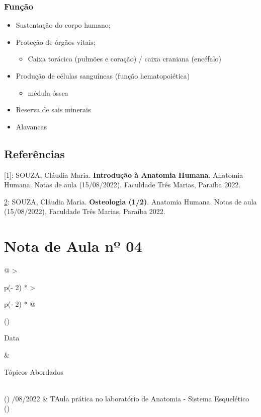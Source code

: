 \documentclass[
]{book}
\providecommand{\tightlist}{%
  \setlength{\itemsep}{0pt}\setlength{\parskip}{0pt}}
\begin{document}
\hypertarget{funuxe7uxe3o}{%
\subsubsection{Função}\label{funuxe7uxe3o}}

\begin{itemize}
\tightlist
\item
  Sustentação do corpo humano;
\item
  Proteção de órgãos vitais;

  \begin{itemize}
  \tightlist
  \item
    Caixa torácica (pulmões e coração) / caixa craniana (encéfalo)
  \end{itemize}
\item
  Produção de células sanguíneas (função hematopoiética)

  \begin{itemize}
  \tightlist
  \item
    médula óssea
  \end{itemize}
\item
  Reserva de sais minerais
\item
  Alavancas
\end{itemize}

\hypertarget{referuxeancias-1}{%
\subsection{Referências}\label{referuxeancias-1}}

{[}1{]}: SOUZA, Cláudia Maria. \textbf{Introdução à Anatomia Humana}. Anatomia Humana. Notas de aula (15/08/2022), Faculdade Três Marias, Paraíba 2022.

\href{MARIEB,\%20Elaine\%20N.;\%20WILHELM,\%20Patricia\%20Brady;\%20MALLAT,\%20Jon.\%20**Anatomia\%20Humana**.\%207.ed.\%20São\%20Paulo:Pearson,\%202014.}{2}: SOUZA, Cláudia Maria. \textbf{Osteologia (1/2)}. Anatomia Humana. Notas de aula (15/08/2022), Faculdade Três Marias, Paraíba 2022.

\hypertarget{nota-de-aula-nuxba-04}{%
\section{Nota de Aula nº 04}\label{nota-de-aula-nuxba-04}}

\begin{longtable}[]{@{}
  >{\raggedright\arraybackslash}p{(\columnwidth - 2\tabcolsep) * }
  >{\raggedright\arraybackslash}p{(\columnwidth - 2\tabcolsep) * }@{}}
\toprule()
\begin{minipage}[b]{\linewidth}\raggedright
Data
\end{minipage} & \begin{minipage}[b]{\linewidth}\raggedright
Tópicos Abordados
\end{minipage} \\
\midrule()
/08/2022 & TAula prática no laboratório de Anatomia - Sistema Esquelético \\
\bottomrule()
\end{longtable}
\end{document}
